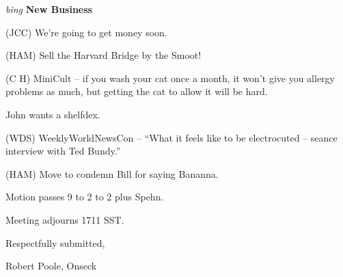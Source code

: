 \vspace{0.15in}
{\em bing\/} {\bf New Business\/}

(JCC) We're going to get money soon.

(HAM) Sell the Harvard Bridge by the Smoot!

(C H) MiniCult -- if you wash your cat once a month, it won't give you allergy
problems as much, but getting the cat to allow it will be hard.

John wants a shelfdex.

(WDS) WeeklyWorldNewsCon -- ``What it feels like to be electrocuted -- seance
interview with Ted Bundy.''

(HAM) Move to condemn Bill for saying Bananna.

Motion passes 9 to 2 to 2 plus Spehn.

Meeting adjourns 1711 SST.

\vspace{0.15in}
\begin{center}
Respectfully submitted,

Robert Poole, Onseck
\end{center}

